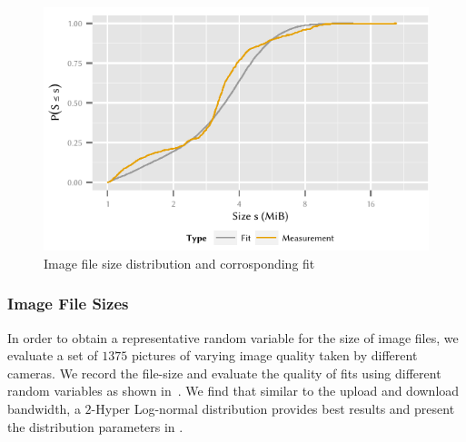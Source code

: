 \begin{figure}
  \includegraphics{application/cloud_file_synchronization/application_measurements/figures/image_size}
  \caption{Image file size distribution \imageFileSize and corrosponding fit}
  \label{fig:application:cloud_file_synchronisation:application_measurements:bandwidth_preparation_times:measurement_setup:image_size}
\end{figure}

\subsubsection*{Image File Sizes}\label{sec:application:cloud_file_synchronisation:application_measurements:image_file_sizes}
In order to obtain a representative random variable for the size of image files, we evaluate a set of \({1375}\) pictures of varying image quality taken by different cameras.
We record the file-size and evaluate the quality of fits using different random variables as shown in~.
We find that similar to the upload and download bandwidth, a \(2\)-Hyper Log-normal distribution provides best results and present the distribution parameters in .

